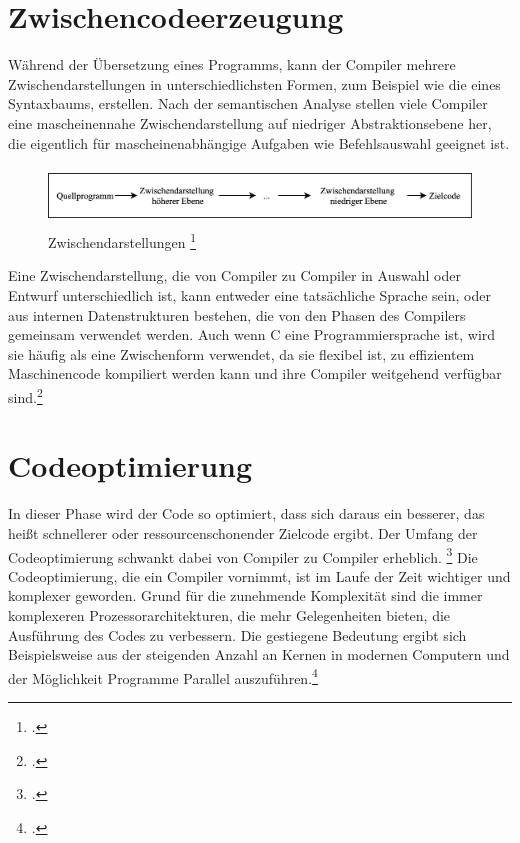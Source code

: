 \section{Zwischencodeerzeugung}
Während der Übersetzung eines Programms,  kann der Compiler mehrere Zwischendarstellungen in unterschiedlichsten Formen,  zum Beispiel wie die eines Syntaxbaums, erstellen.  
Nach der semantischen Analyse stellen viele Compiler eine mascheinennahe Zwischendarstellung auf niedriger Abstraktionsebene her, die eigentlich für mascheinenabhängige Aufgaben wie Befehlsauswahl geeignet ist. 
\begin{figure}[!ht]
 \includegraphics[width=14.5cm,height=1.52cm]{Images/Compiler/Zwischendarstellungen.png}
 \caption[Zwischendarstellungen]{Zwischendarstellungen \protect\footcite{Ullmann2008} }
 \label{fig:Zwischendarstellung}
\end{figure}
Eine Zwischendarstellung, die von Compiler zu Compiler in Auswahl oder Entwurf unterschiedlich ist,  kann entweder eine tatsächliche Sprache sein,  oder aus internen Datenstrukturen bestehen, die von den Phasen des Compilers gemeinsam verwendet werden. Auch wenn C eine Programmiersprache ist, wird sie häufig als eine Zwischenform verwendet, da sie flexibel ist, zu effizientem Maschinencode kompiliert werden kann und ihre Compiler weitgehend verfügbar sind.\footcite[Vgl.][S. 433]{Ullmann2008}


\section{Codeoptimierung}
In dieser Phase wird der Code so optimiert, dass sich daraus ein besserer,  das heißt schnellerer oder ressourcenschonender Zielcode ergibt.  Der Umfang der Codeoptimierung schwankt dabei von Compiler zu Compiler erheblich.  \footcite[Vgl.][S. 11f]{Ullmann2008} 
Die Codeoptimierung, die ein Compiler vornimmt, ist im Laufe der Zeit wichtiger und  komplexer geworden. Grund für die zunehmende Komplexität sind die immer komplexeren Prozessorarchitekturen, die mehr Gelegenheiten bieten, die Ausführung des  Codes zu verbessern. Die gestiegene Bedeutung ergibt sich Beispielsweise aus der steigenden Anzahl an Kernen in modernen Computern und der Möglichkeit Programme Parallel auszuführen.\footcite[Vgl.][S. 20]{Ullmann2008}

